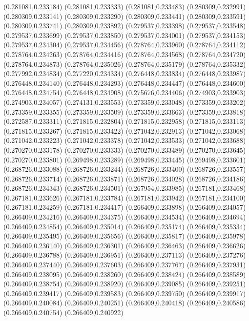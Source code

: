 (0.281081,0.233184)
(0.281081,0.233333)
(0.281081,0.233483)
(0.280309,0.232991)
(0.280309,0.233141)
(0.280309,0.233290)
(0.280309,0.233441)
(0.280309,0.233591)
(0.280309,0.233741)
(0.280309,0.233892)
(0.279537,0.233398)
(0.279537,0.233548)
(0.279537,0.233699)
(0.279537,0.233850)
(0.279537,0.234001)
(0.279537,0.234153)
(0.279537,0.234304)
(0.279537,0.234456)
(0.278764,0.233960)
(0.278764,0.234112)
(0.278764,0.234263)
(0.278764,0.234416)
(0.278764,0.234568)
(0.278764,0.234720)
(0.278764,0.234873)
(0.278764,0.235026)
(0.278764,0.235179)
(0.278764,0.235332)
(0.277992,0.234834)
(0.277220,0.234334)
(0.276448,0.233834)
(0.276448,0.233987)
(0.276448,0.234140)
(0.276448,0.234293)
(0.276448,0.234447)
(0.276448,0.234600)
(0.276448,0.234754)
(0.276448,0.234908)
(0.275676,0.234406)
(0.274903,0.233903)
(0.274903,0.234057)
(0.274131,0.233553)
(0.273359,0.233048)
(0.273359,0.233202)
(0.273359,0.233355)
(0.273359,0.233509)
(0.273359,0.233663)
(0.273359,0.233818)
(0.272587,0.233311)
(0.271815,0.232804)
(0.271815,0.232958)
(0.271815,0.233113)
(0.271815,0.233267)
(0.271815,0.233422)
(0.271042,0.232913)
(0.271042,0.233068)
(0.271042,0.233223)
(0.271042,0.233378)
(0.271042,0.233533)
(0.271042,0.233688)
(0.270270,0.233178)
(0.270270,0.233333)
(0.270270,0.233489)
(0.270270,0.233645)
(0.270270,0.233801)
(0.269498,0.233289)
(0.269498,0.233445)
(0.269498,0.233601)
(0.268726,0.233088)
(0.268726,0.233244)
(0.268726,0.233400)
(0.268726,0.233557)
(0.268726,0.233714)
(0.268726,0.233871)
(0.268726,0.234028)
(0.268726,0.234186)
(0.268726,0.234343)
(0.268726,0.234501)
(0.267954,0.233985)
(0.267181,0.233468)
(0.267181,0.233626)
(0.267181,0.233784)
(0.267181,0.233942)
(0.267181,0.234100)
(0.267181,0.234259)
(0.267181,0.234417)
(0.266409,0.233898)
(0.266409,0.234057)
(0.266409,0.234216)
(0.266409,0.234375)
(0.266409,0.234534)
(0.266409,0.234694)
(0.266409,0.234854)
(0.266409,0.235014)
(0.266409,0.235174)
(0.266409,0.235334)
(0.266409,0.235495)
(0.266409,0.235656)
(0.266409,0.235817)
(0.266409,0.235978)
(0.266409,0.236140)
(0.266409,0.236301)
(0.266409,0.236463)
(0.266409,0.236626)
(0.266409,0.236788)
(0.266409,0.236951)
(0.266409,0.237113)
(0.266409,0.237276)
(0.266409,0.237440)
(0.266409,0.237603)
(0.266409,0.237767)
(0.266409,0.237931)
(0.266409,0.238095)
(0.266409,0.238260)
(0.266409,0.238424)
(0.266409,0.238589)
(0.266409,0.238754)
(0.266409,0.238920)
(0.266409,0.239085)
(0.266409,0.239251)
(0.266409,0.239417)
(0.266409,0.239583)
(0.266409,0.239750)
(0.266409,0.239917)
(0.266409,0.240084)
(0.266409,0.240251)
(0.266409,0.240418)
(0.266409,0.240586)
(0.266409,0.240754)
(0.266409,0.240922)
